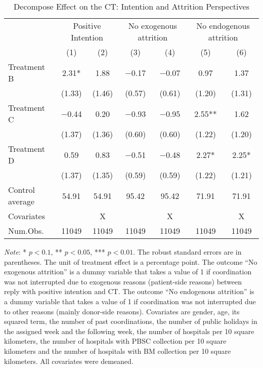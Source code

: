 \documentclass[12pt, a4paper]{article}
\begin{document}
\begin{table}[H]

\caption{\label{tab:lm-test-decompose}Decompose Effect on the CT: Intention and Attrition Perspectives}
\centering
\fontsize{8}{10}\selectfont
\begin{threeparttable}
\begin{tabular}[t]{lcccccc}
\toprule
\multicolumn{1}{c}{ } & \multicolumn{2}{c}{Positive Intention} & \multicolumn{2}{c}{No exogenous attrition} & \multicolumn{2}{c}{No endogenous attrition} \\
\cmidrule(l{3pt}r{3pt}){2-3} \cmidrule(l{3pt}r{3pt}){4-5} \cmidrule(l{3pt}r{3pt}){6-7}
  & (1) & (2) & (3) & (4) & (5) & (6)\\
\midrule
Treatment B & \num{2.31}* & \num{1.88} & \num{-0.17} & \num{-0.07} & \num{0.97} & \num{1.37}\\
 & (\num{1.33}) & (\num{1.46}) & (\num{0.57}) & (\num{0.61}) & (\num{1.20}) & (\num{1.31})\\
Treatment C & \num{-0.44} & \num{0.20} & \num{-0.93} & \num{-0.95} & \num{2.55}** & \num{1.62}\\
 & (\num{1.37}) & (\num{1.36}) & (\num{0.60}) & (\num{0.60}) & (\num{1.22}) & (\num{1.20})\\
Treatment D & \num{0.59} & \num{0.83} & \num{-0.51} & \num{-0.48} & \num{2.27}* & \num{2.25}*\\
 & (\num{1.37}) & (\num{1.35}) & (\num{0.59}) & (\num{0.59}) & (\num{1.22}) & (\num{1.21})\\
\midrule
Control average & 54.91 & 54.91 & 95.42 & 95.42 & 71.91 & 71.91\\
Covariates &  & X &  & X &  & X\\
Num.Obs. & \num{11049} & \num{11049} & \num{11049} & \num{11049} & \num{11049} & \num{11049}\\
\bottomrule
\end{tabular}
\begin{tablenotes}
\item \emph{Note}: * $p < 0.1$, ** $p < 0.05$, *** $p < 0.01$. The robust standard errors are in parentheses. The unit of treatment effect is a percentage point. The outcome ``No exogenous attrition'' is a dummy variable that takes a value of 1 if coordination was not interrupted due to exogenous reasons (patient-side reasons) between reply with positive intention and CT. The outcome ``No endogenous attrition'' is a dummy variable that takes a value of 1 if coordination was not interrupted due to other reasons (mainly donor-side reasons). Covariates are gender, age, its squared term, the number of past coordinations, the number of public holidays in the assigned week and the following week, the number of hospitals per 10 square kilometers, the number of hospitals with PBSC collection per 10 square kilometers and the number of hospitals with BM collection per 10 square kilometers. All covariates were demeaned.
\end{tablenotes}
\end{threeparttable}
\end{table}
\end{document}
